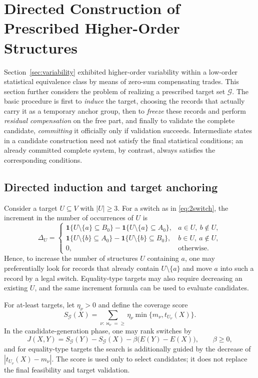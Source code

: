\documentclass[11pt,a4paper]{article}
\numberwithin{equation}{section}
\theoremstyle{definition}
\numberwithin{algorithm}{section}
\begin{document}
\section{Directed Construction of Prescribed Higher-Order Structures}\label{sec:directed}

Section~\ref{sec:variability} exhibited higher-order variability within a low-order
statistical equivalence class by means of zero-sum compensating trades.
This section further considers the problem of realizing a prescribed target set $\mathcal G$.
The basic procedure is first to \emph{induce} the target, choosing the records that actually
carry it as a temporary anchor group, then to \emph{freeze} these records and perform
\emph{residual compensation} on the free part, and finally to validate the complete
candidate, \emph{committing} it officially only if validation succeeds.
Intermediate states in a candidate construction need not satisfy the final statistical
conditions; an already committed complete system, by contrast, always satisfies the
corresponding conditions.

\subsection{Directed induction and target anchoring}\label{subsec:directed-induction}

Consider a target $U\subseteq V$ with $|U|\ge3$.
For a switch as in \eqref{eq:2switch}, the increment in the number of occurrences of $U$ is
\begin{equation}
\Delta_U=
\begin{cases}
\mathbf1\{U\setminus\{a\}\subseteq B_0\}
-\mathbf1\{U\setminus\{a\}\subseteq A_0\},
&a\in U,\ b\notin U,\\
\mathbf1\{U\setminus\{b\}\subseteq A_0\}
-\mathbf1\{U\setminus\{b\}\subseteq B_0\},
&b\in U,\ a\notin U,\\
0,&\text{otherwise}.
\end{cases}
\label{eq:directed-gain}
\end{equation}
Hence, to increase the number of structures $U$ containing $a$, one may preferentially look
for records that already contain $U\setminus\{a\}$ and move $a$ into such a record by a legal
switch.
Equality-type targets may also require decreasing an existing $U$, and the same increment
formula can be used to evaluate candidates.

For at-least targets, let $\eta_\nu>0$ and define the coverage score
\begin{equation}
S_{\mathcal G}(X)=
\sum_{\nu:\bowtie_\nu=\ge}
\eta_\nu\min\{m_\nu,t_{U_\nu}(X)\}.
\label{eq:directed-score}
\end{equation}
In the candidate-generation phase, one may rank switches by
\begin{equation}
J(X,Y)=S_{\mathcal G}(Y)-S_{\mathcal G}(X)
-\beta\bigl(E(Y)-E(X)\bigr),\qquad \beta\ge0,
\label{eq:directed-priority}
\end{equation}
and for equality-type targets the search is additionally guided by the decrease of
$|t_{U_\nu}(X)-m_\nu|$.
The score is used only to select candidates; it does not replace the final feasibility and
target validation.
\end{document}
